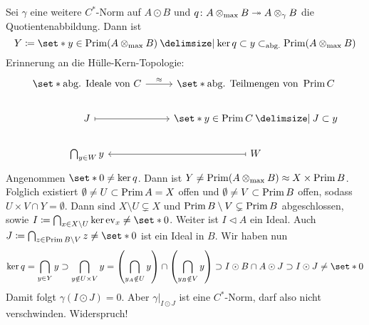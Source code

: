 \begin{beweis}
\begin{enumerate}[(i)]
        Sei $\gamma$ eine weitere $C^*$-Norm auf $A \odot B$ und $q \colon A \mathbin{\otimes_{\max}} B \twoheadrightarrow  A \otimes_\gamma B$ die Quotientenabbildung.
        Dann ist 
        \[
            Y \coloneqq \set*{y \in \Prim(A \tensormax B) \given \ker q \subset y} \subset_{\mathrm{abg.}} \Prim \enbrace*{A \tensormax B}
        \]
        Erinnerung an die Hülle-Kern-Topologie: 
        \[
            \begin{tikzcd}
                \set*{\text{abg. Ideale von }C} \rar["\approx"] & \set*{\text{abg. Teilmengen von }\Prim C } \\
                J \rar[mapsto] & \set*{y \in \Prim C \given J \subset y} \\
                \bigcap_{y \in W} y & W \lar[mapsto]
            \end{tikzcd}
        \]
        Angenommen $\set*{0} \neq \ker q$.
        Dann ist $Y \neq \operatorname{Prim} (A \mathbin{\otimes_{\max}} B) \approx X \times \operatorname{Prim} B$.
        Folglich existiert $\emptyset \neq U \subset \operatorname{Prim} A =X$ offen und $\emptyset \neq V \subset \operatorname{Prim} B$ offen, sodass $U \times V \cap Y = \emptyset$.
        Dann sind $X \setminus U \subsetneq X$ und $\operatorname{Prim} B \setminus V \subsetneq \operatorname{Prim} B$ abgeschlossen, sowie $I \coloneqq \bigcap_{x \in X \setminus U} \ker \ev_x \neq \set*{0}$.
        Weiter ist $I \lhd A$ ein Ideal.
        Auch
        \(
            J \coloneqq \bigcap_{z \in \Prim B \setminus V} z \neq \set*{0}
        \)
        ist ein Ideal in $B$.
        Wir haben nun
        \[
            \ker q = \bigcap_{y \in Y} y \supset \bigcap_{y \notin U \times V} y = \enbrace*{\bigcap_{y_A \notin U} y} \cap \enbrace*{\bigcap_{y_B \notin V} y} \supset I \odot B \cap A \odot J \supset I \odot J \neq \set*{0}
        \]
        Damit folgt $\gamma(I \odot J)=0$.
        Aber $\gamma|_{I \odot J}$ ist eine $C^*$-Norm, darf also nicht verschwinden. Widerspruch!\qedhere
	\end{enumerate}
\end{beweis}

